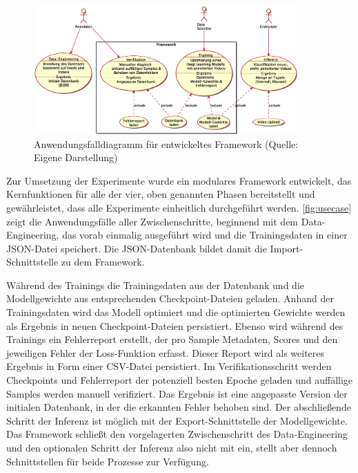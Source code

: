 \begin{figure}[htbp!]
    \centering
    \includegraphics[width=0.9\textwidth, height=0.8\textwidth, keepaspectratio, interpolate]{fig/usecase.eps}
    \caption[Anwendungsfalldiagramm für entwickeltes Framework]{Anwendungsfalldiagramm für entwickeltes Framework (Quelle: Eigene Darstellung)}
    \label{fig:usecase}
\end{figure}

Zur Umsetzung der Experimente wurde ein modulares Framework entwickelt, das Kernfunktionen für alle der vier, oben genannten Phasen bereitstellt und gewährleistet, dass alle Experimente einheitlich durchgeführt werden.
\autoref{fig:usecase} zeigt die Anwendungsfälle aller Zwischenschritte, beginnend mit dem Data-Engineering, das vorab einmalig ausgeführt wird und die Trainingsdaten in einer JSON-Datei speichert.
Die JSON-Datenbank bildet damit die Import-Schnittstelle zu dem Framework.

Während des Trainings die Trainingsdaten aus der Datenbank und die Modellgewichte aus entsprechenden Checkpoint-Dateien geladen.
Anhand der Trainingsdaten wird das Modell optimiert und die optimierten Gewichte werden als Ergebnis in neuen Checkpoint-Dateien persistiert.
Ebenso wird während des Trainings ein Fehlerreport erstellt, der pro Sample Metadaten, Scores und den jeweiligen Fehler der Loss-Funktion erfasst.
Dieser Report wird als weiteres Ergebnis in Form einer CSV-Datei persistiert.
Im Verifikationsschritt werden Checkpoints und Fehlerreport der potenziell besten Epoche geladen und auffällige Samples werden manuell verifiziert.
Das Ergebnis ist eine angepasste Version der initialen Datenbank, in der die erkannten Fehler behoben sind.
Der abschließende Schritt der Inferenz ist möglich mit der Export-Schnittstelle der Modellgewichte.
Das Framework schließt den vorgelagerten Zwischenschritt des Data-Engineering und den optionalen Schritt der Inferenz also nicht mit ein, stellt aber dennoch Schnittstellen für beide Prozesse zur Verfügung.

